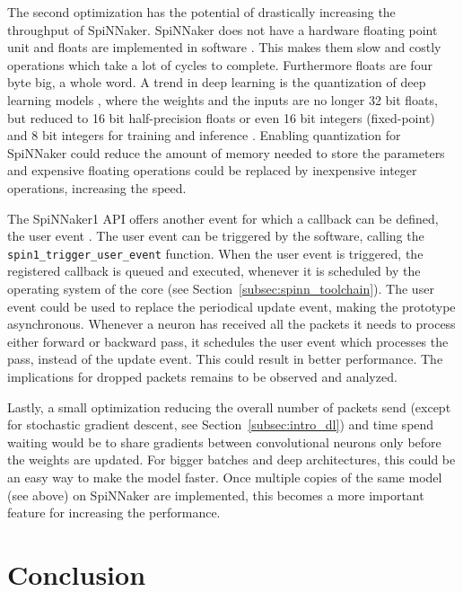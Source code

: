 \documentclass[]{article}
\begin{document}
The second optimization has the potential of drastically increasing
the throughput of SpiNNaker.
SpiNNaker does not have a hardware floating point unit and floats are
implemented in software \citep{furber_et_al_2020}.
This makes them slow and costly operations which take a lot of cycles
to complete.
Furthermore floats are four byte big, a whole word.
A trend in deep learning is the quantization of deep learning models
\citep{praveen_2020}, where the weights and the inputs are no longer
32 bit floats, but reduced to 16 bit half-precision floats or even
16 bit integers (fixed-point) and 8 bit integers for training and
inference \citep{das_et_al_2018}.
Enabling quantization for SpiNNaker could reduce the amount of memory
needed to store the parameters and expensive floating operations
could be replaced by inexpensive integer operations, increasing the
speed.

The SpiNNaker1 API offers another event for which a callback can
be defined, the user event \citep{furber_et_al_2020}.
The user event can be triggered by the software, calling the
\texttt{spin1\_\-trigger\_user\_event} function.
When the user event is triggered, the registered callback is queued
and executed, whenever it is scheduled by the operating system of the
core (see Section~\ref{subsec:spinn_toolchain}).
The user event could be used to replace the periodical update event,
making the prototype asynchronous.
Whenever a neuron has received all the packets it needs to process
either forward or backward pass, it schedules the user event which
processes the pass, instead of the update event.
This could result in better performance.
The implications for dropped packets remains to be observed and
analyzed.

Lastly, a small optimization reducing the overall number of packets
send (except for stochastic gradient descent, see
Section~\ref{subsec:intro_dl}) and time spend waiting would be to
share gradients between convolutional neurons only before the weights
are updated.
For bigger batches and deep architectures, this could be an easy way
to make the model faster.
Once multiple copies of the same model (see above) on SpiNNaker are
implemented, this becomes a more important feature for increasing the
performance.



\section{Conclusion} %
\label{sec:conclusion}
\end{document}
